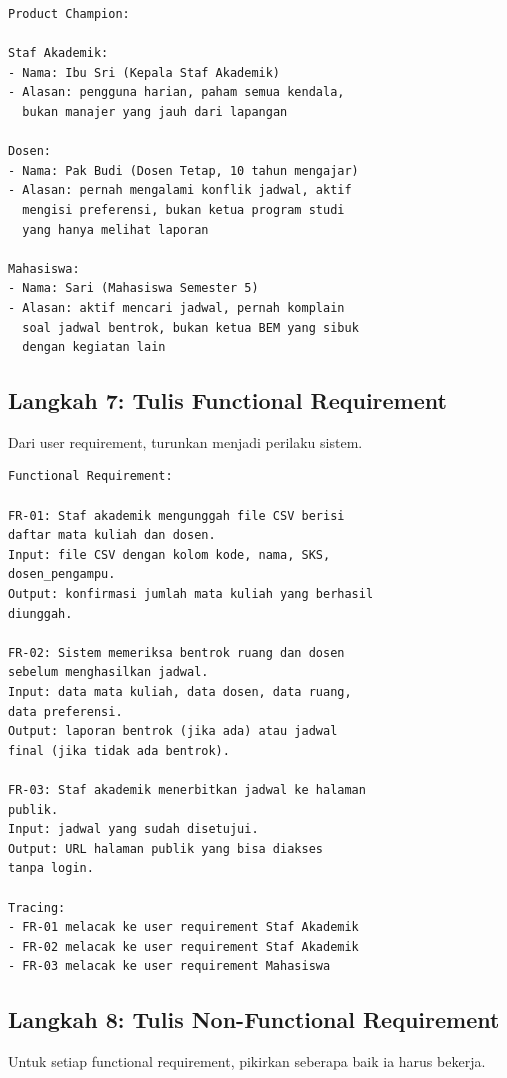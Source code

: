 \documentclass[11pt,a4paper]{article}
\begin{document}
\begin{lstlisting}[style=out]
Product Champion:

Staf Akademik:
- Nama: Ibu Sri (Kepala Staf Akademik)
- Alasan: pengguna harian, paham semua kendala,
  bukan manajer yang jauh dari lapangan

Dosen:
- Nama: Pak Budi (Dosen Tetap, 10 tahun mengajar)
- Alasan: pernah mengalami konflik jadwal, aktif
  mengisi preferensi, bukan ketua program studi
  yang hanya melihat laporan

Mahasiswa:
- Nama: Sari (Mahasiswa Semester 5)
- Alasan: aktif mencari jadwal, pernah komplain
  soal jadwal bentrok, bukan ketua BEM yang sibuk
  dengan kegiatan lain
\end{lstlisting}

\subsection{Langkah 7: Tulis Functional Requirement}

Dari user requirement, turunkan menjadi perilaku sistem.

\begin{lstlisting}[style=out]
Functional Requirement:

FR-01: Staf akademik mengunggah file CSV berisi
daftar mata kuliah dan dosen.
Input: file CSV dengan kolom kode, nama, SKS,
dosen_pengampu.
Output: konfirmasi jumlah mata kuliah yang berhasil
diunggah.

FR-02: Sistem memeriksa bentrok ruang dan dosen
sebelum menghasilkan jadwal.
Input: data mata kuliah, data dosen, data ruang,
data preferensi.
Output: laporan bentrok (jika ada) atau jadwal
final (jika tidak ada bentrok).

FR-03: Staf akademik menerbitkan jadwal ke halaman
publik.
Input: jadwal yang sudah disetujui.
Output: URL halaman publik yang bisa diakses
tanpa login.

Tracing:
- FR-01 melacak ke user requirement Staf Akademik
- FR-02 melacak ke user requirement Staf Akademik
- FR-03 melacak ke user requirement Mahasiswa
\end{lstlisting}

\subsection{Langkah 8: Tulis Non-Functional Requirement}

Untuk setiap functional requirement, pikirkan seberapa baik ia harus bekerja.
\end{document}
